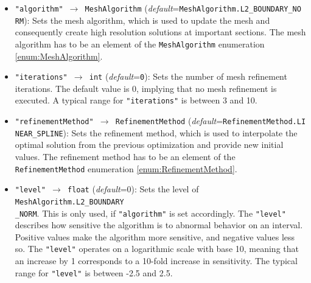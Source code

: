 \documentclass[12pt]{article}
\begin{document}
\begin{mdframed}[backgroundcolor=gray!10, roundcorner=10pt,
		linewidth=1pt]

	\begin{itemize}

		\label{flag:MeshAlgorithm}
		\item \texttt{"algorithm" $\rightarrow$ MeshAlgorithm}
		      (\emph{default}=\texttt{MeshAlgorithm.L2\_BOUNDARY\_NO\\RM}): Sets the
		      mesh algorithm, which is used to update the mesh and
		      consequently create high
		      resolution solutions at important sections. The mesh
		      algorithm has to be an
		      element of the \texttt{MeshAlgorithm} enumeration
		      \eqref{enum:MeshAlgorithm}.

		      \label{flag:meshIterations}
		\item \texttt{"iterations" $\rightarrow$ int}
		      (\emph{default}=\texttt{0}): Sets the number of mesh
		      refinement iterations. The
		      default value is 0, implying that no mesh refinement is
		      executed.
		      A typical range for \texttt{"iterations"} is between
		      3 and 10.

		      \label{flag:RefinementMethod}
		\item \texttt{"refinementMethod" $\rightarrow$
			      RefinementMethod}
		      (\emph{default}=\texttt{RefinementMethod.LI}
		      \texttt{NEAR\_SPLINE}): Sets the
		      refinement method, which is used to interpolate the
		      optimal solution from the
		      previous optimization and provide new initial values. The
		      refinement method has
		      to be an element of the \texttt{RefinementMethod}
		      enumeration
		      \eqref{enum:RefinementMethod}.

		      \label{flag:meshLevel}
		\item \texttt{"level" $\rightarrow$ float}
		      (\emph{default}=0): Sets
		      the level of \texttt{MeshAlgorithm.L2\_BOUNDARY\\\_NORM}.
		      This is only used, if
		      \texttt{"algorithm"} is set accordingly. The
		      \texttt{"level"} describes
		      how sensitive the algorithm is to abnormal behavior on an
		      interval. Positive
		      values make the algorithm more sensitive, and negative
		      values less so. The
		      \texttt{"level"} operates on a logarithmic scale with
		      base 10, meaning that
		      an increase by 1 corresponds to a 10-fold increase in
		      sensitivity. The typical
		      range for \texttt{"level"} is between -2.5 and 2.5.


\end{itemize}
\end{mdframed}
\end{document}
